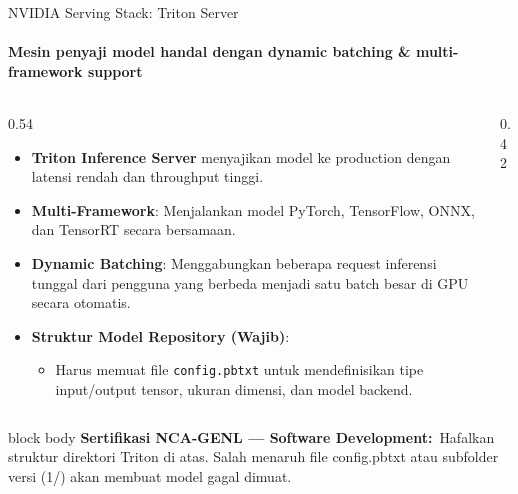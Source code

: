 \documentclass[aspectratio=169,t]{beamer}
\newcommand{\certnote}[2]{%
  \vspace{0.1em}
  \begin{beamercolorbox}[rounded=true,shadow=false,sep=4pt]{block body}
    {\scriptsize\color{nvblue}\textbf{Sertifikasi NCA-GENL --- #1:}}\,
    {\scriptsize\color{nvgray}#2}
  \end{beamercolorbox}%
}
\begin{document}
\begin{frame}{NVIDIA Serving Stack: Triton Server}
  \framesubtitle{Mesin penyaji model handal dengan dynamic batching \& multi-framework support}
  \begin{columns}[T]
    \begin{column}{0.54\textwidth}
      \begin{itemize}\footnotesize
        \item \textbf{Triton Inference Server} menyajikan model ke production dengan latensi rendah dan throughput tinggi.
        \item \textbf{Multi-Framework}: Menjalankan model PyTorch, TensorFlow, ONNX, dan TensorRT secara bersamaan.
        \item \textbf{Dynamic Batching}: Menggabungkan beberapa request inferensi tunggal dari pengguna yang berbeda menjadi satu batch besar di GPU secara otomatis.
        \item \textbf{Struktur Model Repository (Wajib)}:
          \begin{itemize}\scriptsize
            \item Harus memuat file \texttt{config.pbtxt} untuk mendefinisikan tipe input/output tensor, ukuran dimensi, dan model backend.
          \end{itemize}
      \end{itemize}
    \end{column}
    \begin{column}{0.42\textwidth}
      \begin{center}
      \end{center}
    \end{column}
  \end{columns}
  \certnote{Software Development}{Hafalkan struktur direktori Triton di atas. Salah menaruh file config.pbtxt atau subfolder versi (1/) akan membuat model gagal dimuat.}
\end{frame}
\end{document}
